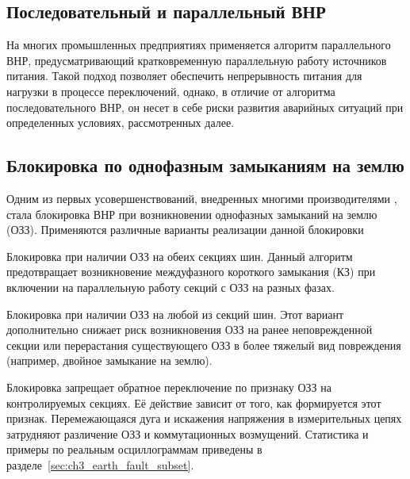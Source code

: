 \subsection{Последовательный и параллельный ВНР}
\label{sec:ch02_vnr_series_parallel}

На многих промышленных предприятиях применяется алгоритм параллельного ВНР,
предусматривающий кратковременную параллельную работу источников питания. Такой подход
позволяет обеспечить непрерывность питания для нагрузки в процессе переключений, однако,
в отличие от алгоритма последовательного ВНР, он несет в себе риски развития аварийных
ситуаций при определенных условиях, рассмотренных далее.\par\vspace{0.2cm}

\subsection{Блокировка по однофазным замыканиям на землю}
\label{sec:ch02_vnr_blocking_ground_fault}

Одним из первых усовершенствований, внедренных многими производителями \cite{bavr_bib_043_rukovodstvo_2024,bavr_bib_044_rukovodstvo_2017,bavr_bib_045_rukovodstvo_2021,bavr_bib_046_rukovodstvo_2014},
стала блокировка ВНР при возникновении однофазных замыканий на землю (ОЗЗ). Применяются
различные варианты реализации данной блокировки\par\vspace{0.2cm}

Блокировка при наличии ОЗЗ на обеих секциях шин. Данный алгоритм предотвращает
возникновение междуфазного короткого замыкания (КЗ) при включении на параллельную работу
секций с ОЗЗ на разных фазах.\par\vspace{0.2cm}

Блокировка при наличии ОЗЗ на любой из секций шин. Этот вариант дополнительно снижает
риск возникновения ОЗЗ на ранее неповрежденной секции или перерастания существующего ОЗЗ
в более тяжелый вид повреждения (например, двойное замыкание на
землю).\par\vspace{0.2cm}

Блокировка запрещает обратное переключение по признаку ОЗЗ на контролируемых секциях. Её
действие зависит от того, как формируется этот признак. Перемежающаяся дуга и искажения
напряжения в измерительных цепях затрудняют различение ОЗЗ и коммутационных возмущений.
Статистика и примеры по реальным осциллограммам приведены в
разделе~\ref{sec:ch3_earth_fault_subset}.\par\vspace{0.2cm}

